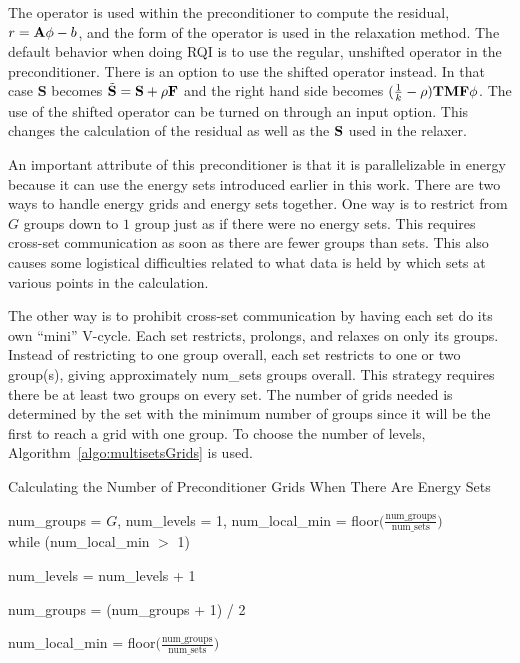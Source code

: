 The operator is used within the preconditioner to compute the residual, $r = \mathbf{A}\phi - b$, and the form of the operator is used in the relaxation method. The default behavior when doing RQI is to use the regular, unshifted operator in the preconditioner. There is an option to use the shifted operator instead. In that case $\mathbf{S}$ becomes $\tilde{\mathbf{S}} = \mathbf{S} + \rho\mathbf{F}$ and the right hand side becomes $(\frac{1}{k} - \rho)\mathbf{TMF}\phi$. The use of the shifted operator can be turned on through an input option. This changes the calculation of the residual as well as the $\mathbf{S}$ used in the relaxer.

An important attribute of this preconditioner is that it is parallelizable in energy because it can use the energy sets introduced earlier in this work. There are two ways to handle energy grids and energy sets together. One way is to restrict from $G$ groups down to $1$ group just as if there were no energy sets. This requires cross-set communication as soon as there are fewer groups than sets. This also causes some logistical difficulties related to what data is held by which sets at various points in the calculation. 

The other way is to prohibit cross-set communication by having each set do its own ``mini'' V-cycle. Each set restricts, prolongs, and relaxes on only its groups. Instead of restricting to one group overall, each set restricts to one or two group(s), giving approximately num\_sets groups overall. This strategy requires there be at least two groups on every set. The number of grids needed is determined by the set with the minimum number of groups since it will be the first to reach a grid with one group. To choose the number of levels, Algorithm~\ref{algo:multisetsGrids} is used. 
%
\begin{algorithm}
  \caption{ Calculating the Number of Preconditioner Grids When There Are Energy Sets}
  \label{algo:multisetsGrids}
   num\_groups = $G$, num\_levels = 1, num\_local\_min = floor$\bigl( \frac{\text{num\_groups}}{\text{num\_sets}}\bigr)$ \\
   while (num\_local\_min $>$ 1)
  \begin{list}{}{\hspace{2.5em}}
    \item num\_levels = num\_levels + 1
    \item num\_groups = (num\_groups + 1) / 2
    \item num\_local\_min = floor$\bigl( \frac{\text{num\_groups}}{\text{num\_sets}}\bigr)$
   \end{list}
\end{algorithm}

